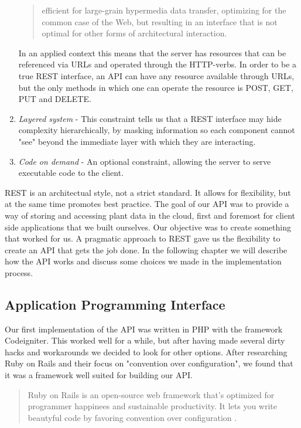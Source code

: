 \begin{enumerate}
\begin{quote} efficient for large-grain hypermedia data transfer, optimizing for the common case of the Web, but resulting in an interface that is not optimal for other forms of architectural interaction. \citep{fielding2000architectural} 
\end{quote}

In an applied context this means that the server has resources that can be referenced via URLs and operated through the HTTP-verbs. In order to be a true REST interface, an API can have any resource available through URLs, but the only methods in which one can operate the resource is POST, GET, PUT and DELETE.

\item{} \emph{Layered system} - This constraint tells us that a REST interface may hide complexity hierarchically, by masking information so each component cannot "see" beyond the immediate layer with which they are interacting. \citep{fielding2000architectural}

\item{} \emph{Code on demand} - An optional constraint, allowing the server to serve executable code to the client. 

\end{enumerate}

REST is an architectual style, not a strict standard. It allows for flexibility, but at the same time promotes best practice. The goal of our API was to provide a way of storing and accessing plant data in the cloud, first and foremost for client side applications that we built ourselves. Our objective was to create something that worked for us. A pragmatic approach to REST gave us the flexibility to create an API that gets the job done. In the following chapter we will describe how the API works and discuss some choices we made in the implementation process.

\subsection{Application Programming Interface}
Our first implementation of the API was written in PHP with the framework Codeigniter. This worked well for a while, but after having made several dirty hacks and workarounds we decided to look for other options. After researching Ruby on Rails and their focus on "convention over configuration", we found that it was a framework well suited for building our API.  

\begin{quote}
Ruby on Rails is an open-source web framework that’s optimized for programmer happinees and sustainable productivity. It lets you write beautyful code by favoring convention over configuration \citep{rubyonrails.org}. 
\end{quote}

